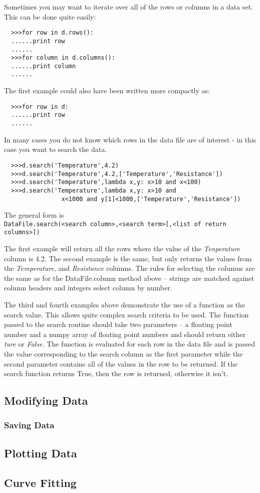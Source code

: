 \documentclass[a4paper,11pt]{scrartcl}
\begin{document}
Sometimes you may want to iterate over all of the rows or columns in a data set. This can be done quite easily:
\begin{verbatim}
  >>>for row in d.rows():
  ......print row
  ......
  >>>for column in d.columns():
  ......print column
  ......
\end{verbatim}
The first example could also have been written more compactly as:
\begin{verbatim}
  >>>for row in d:
  ......print row
  ......
\end{verbatim}

In many cases you do not know which rows in the data file are of interest - in this case you want to search the data.
\begin{verbatim}
  >>>d.search('Temperature',4.2)
  >>>d.search('Temperature',4.2,['Temperature','Resistance'])
  >>>d.search('Temperature',lambda x,y: x>10 and x<100)
  >>>d.search('Temperature',lambda x,y: x>10 and 
                x<1000 and y[1]<1000,['Temperature','Resistance'])
\end{verbatim}
The general form is \\\verb:DataFile.search(<search column>,<search term>[,<list of return columns>]):

The first example will return all the rows where the value of the \textit{Tenperature} column is 4.2. The second example is the same, but only returns the values from the \textit{Temperature}, and \textit{Resistance} columns. The rules for selecting the columns are the same as for the DataFile.column method above -- strings are matched against column headers and integers select column by number.

The third and fourth examples above demonstrate the use of a function as the search value. This allows quite complex search criteria to be used. The function passed to the search routine should take two parameters -- a floating point number and a numpy array of floating point numbers and should return either \textit{ture} or \textit{False}. The function is evaluated for each row in the data file and is passed the value corresponding to the search column as the first parameter while the second parameter contains all of the values in the row to be returned. If the search function returns True, then the row is returned, otherwise it isn't.

\subsection{Modifying Data}



\subsubsection{Saving Data}

\subsection{Plotting Data}

\subsection{Curve Fitting}
\end{document}
